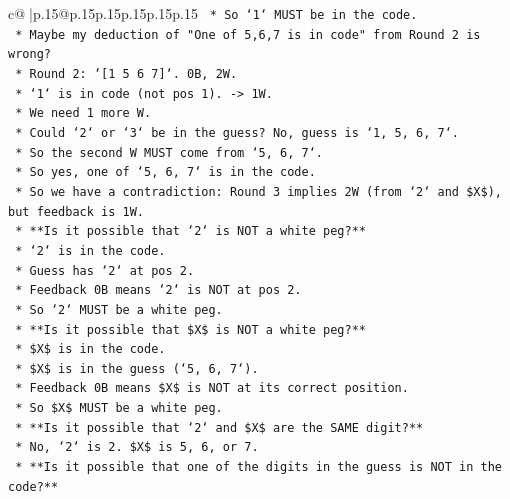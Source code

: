\documentclass{article}
\begin{document}
{\begin{supertabular}{c@{$\;$}|p{.15\linewidth}@{}p{.15\linewidth}p{.15\linewidth}p{.15\linewidth}p{.15\linewidth}p{.15\linewidth}}
{{{\texttt{                        *   So `1` MUST be in the code.} \\
\texttt{                    *   Maybe my deduction of "One of 5,6,7 is in code" from Round 2 is wrong?} \\
\texttt{                        *   Round 2: `{[}1 5 6 7{]}`. 0B, 2W.} \\
\texttt{                        *   `1` is in code (not pos 1). {-}> 1W.} \\
\texttt{                        *   We need 1 more W.} \\
\texttt{                        *   Could `2` or `3` be in the guess? No, guess is `1, 5, 6, 7`.} \\
\texttt{                        *   So the second W MUST come from `5, 6, 7`.} \\
\texttt{                        *   So yes, one of `5, 6, 7` is in the code.} \\
\texttt{                    *   So we have a contradiction: Round 3 implies 2W (from `2` and \$X\$), but feedback is 1W.} \\
\texttt{                    *   **Is it possible that `2` is NOT a white peg?**} \\
\texttt{                        *   `2` is in the code.} \\
\texttt{                        *   Guess has `2` at pos 2.} \\
\texttt{                        *   Feedback 0B means `2` is NOT at pos 2.} \\
\texttt{                        *   So `2` MUST be a white peg.} \\
\texttt{                    *   **Is it possible that \$X\$ is NOT a white peg?**} \\
\texttt{                        *   \$X\$ is in the code.} \\
\texttt{                        *   \$X\$ is in the guess (`5, 6, 7`).} \\
\texttt{                        *   Feedback 0B means \$X\$ is NOT at its correct position.} \\
\texttt{                        *   So \$X\$ MUST be a white peg.} \\
\texttt{                    *   **Is it possible that `2` and \$X\$ are the SAME digit?**} \\
\texttt{                        *   No, `2` is 2. \$X\$ is 5, 6, or 7.} \\
\texttt{                    *   **Is it possible that one of the digits in the guess is NOT in the code?**} \\
}}}
\end{supertabular}}
\end{document}
